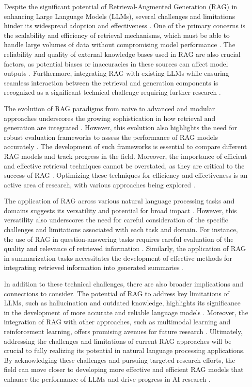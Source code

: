 \documentclass[conference]{IEEEtran}
\begin{document}
Despite the significant potential of Retrieval-Augmented Generation (RAG) in enhancing Large Language Models (LLMs), several challenges and limitations hinder its widespread adoption and effectiveness \cite{b1}. One of the primary concerns is the scalability and efficiency of retrieval mechanisms, which must be able to handle large volumes of data without compromising model performance \cite{b2}. The reliability and quality of external knowledge bases used in RAG are also crucial factors, as potential biases or inaccuracies in these sources can affect model outputs \cite{b3}. Furthermore, integrating RAG with existing LLMs while ensuring seamless interaction between the retrieval and generation components is recognized as a significant technical challenge requiring further research \cite{b4}.

The evolution of RAG paradigms from naive to advanced and modular approaches underscores the growing sophistication in how retrieval and generation are integrated \cite{b5}. However, this evolution also highlights the need for robust evaluation frameworks to assess the performance of RAG models accurately \cite{b6}. The development of such frameworks is essential to compare different RAG models and track progress in the field. Moreover, the importance of efficient and effective retrieval techniques cannot be overstated, as they are critical to the success of RAG \cite{b7}. Optimizing these techniques for efficiency and effectiveness is an active area of research, with various approaches being explored \cite{b8}.

The application of RAG across various natural language processing tasks and domains suggests its versatility and potential for broad impact \cite{b9}. However, this versatility also underscores the need for careful consideration of the specific challenges and limitations associated with each task and domain. For instance, the use of RAG in question-answering tasks requires careful evaluation of the quality and relevance of retrieved information \cite{b10}. Similarly, the application of RAG in summarization tasks necessitates the development of effective methods for integrating retrieved information into generated summaries \cite{b11}.

In addition to these technical challenges, there are also broader implications and connections to consider. The potential of RAG to address key limitations of LLMs, such as hallucination and outdated knowledge, highlights its significance in the development of more accurate and reliable language models \cite{b12}. Moreover, the integration of RAG with other approaches, such as multimodal learning and reinforcement learning, offers promising avenues for future research \cite{b13}. Ultimately, addressing the challenges and limitations of current RAG approaches will be crucial to fully realizing its potential in natural language processing applications. By acknowledging these challenges and pursuing targeted research efforts, the field can move closer to developing more effective and efficient RAG models that enhance the performance of LLMs and drive progress in AI research \cite{b14}.
\end{document}

